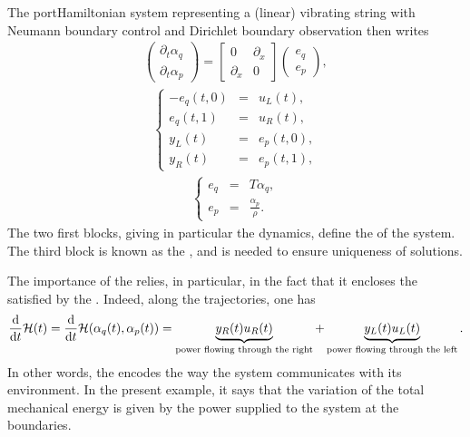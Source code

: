 \documentclass[letterpaper,10pt,english]{sphinxmanual}
\begin{document}
\sphinxAtStartPar
The port\sphinxhyphen{}Hamiltonian system representing a (linear) vibrating string
with Neumann boundary control and Dirichlet boundary observation then
writes
\begin{equation*}
\begin{split}\begin{pmatrix} \partial_t \alpha_q \\ \partial_t \alpha_p \end{pmatrix}
=
\begin{bmatrix} 0 & \partial_x \\ \partial_x & 0 \end{bmatrix}
\begin{pmatrix} e_q \\ e_p \end{pmatrix},\end{split}
\end{equation*}\begin{equation*}
\begin{split}\left\lbrace
\begin{array}{rcl}
- e_q(t,0) &=& u_L(t), \\
e_q(t,1) &=& u_R(t), \\
y_L(t) &=& e_p(t,0), \\
y_R(t) &=& e_p(t,1),
\end{array}
\right.\end{split}
\end{equation*}\begin{equation*}
\begin{split}\left\lbrace
\begin{array}{rcl}
e_q &=& T \alpha_q, \\
e_p &=& \frac{\alpha_p}{\rho}.
\end{array}
\right.\end{split}
\end{equation*}
\sphinxAtStartPar
The two first blocks, giving in particular the dynamics, define the
 of the system. The third block is known as the
, and is needed to ensure uniqueness of
solutions.

\sphinxAtStartPar
The importance of the  relies, in particular, in the
fact that it encloses the  satisfied by the
. Indeed, along the trajectories, one has
\begin{equation*}
\begin{split}\frac{\rm d}{{\rm d}t} \mathcal{H}(t) = \frac{\rm d}{{\rm d}t} \mathcal{H}(\alpha_q(t), \alpha_p(t)) = \underbrace{y_R(t) u_R(t)}_{\text{power flowing through the right}} + \underbrace{y_L(t) u_L(t)}_{\text{power flowing through the left}}.\end{split}
\end{equation*}
\sphinxAtStartPar
In other words, the  encodes the way the system
communicates with its environment. In the present example, it says that
the variation of the total mechanical energy is given by the power
supplied to the system at the boundaries.
\end{document}
